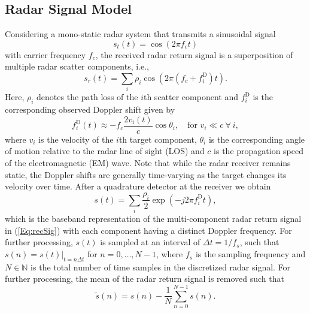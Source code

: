 \subsection{Radar Signal Model}
Considering a mono-static radar system that transmits a sinusoidal signal \cite{Che11}
\begin{equation} %
s_t(t) = \cos{\left(2 \pi f_c t\right)}
\end{equation}
with carrier frequency $f_c$, the received radar return signal is a superposition of multiple radar scatter components, i.e.,
\begin{equation}
s_r(t) = \sum_i \rho_i \cos{\left(2 \pi \left(f_c + f^\mathrm{D}_i \right) t\right)}.
\label{Eq:recSig}
\end{equation}
Here, $\rho_i$ denotes the path loss of the $i$th scatter component and $f^\mathrm{D}_i $ is the corresponding observed Doppler shift given by 
\begin{equation}
f^\mathrm{D}_i (t) \approx - f_c \frac{2 v_i(t)}{c} \cos{\theta_i}, \quad \text{for~} v_i \ll c~\forall~i,
\label{eq:Doppler}
\end{equation}
where $v_i$ is the velocity of the $i$th target component, $\theta_i$ is the corresponding angle of motion relative to the radar line of sight (LOS) and $c$ is the propagation speed of the electromagnetic (EM) wave. Note that while the radar receiver remains static, the Doppler shifts are generally time-varying as the target changes its velocity over time. After a quadrature detector at the receiver we obtain
\begin{equation}
s(t) = \sum_i \frac{\rho_i}{2} \exp{\left(-j 2 \pi f^\mathrm{D}_i  t\right)},
\end{equation}
which is the baseband representation of the multi-component radar return signal in (\ref{Eq:recSig}) with each component having a distinct Doppler frequency. For further processing, $s(t)$ is sampled at an interval of $\Delta t = 1/f_s$, such that $s(n) = s(t)|_{t=n\Delta t}$ for $n = 0, \dots ,N-1$, where $f_s$ is the sampling frequency and $N \in \mathbb{N}$ is the total number of time samples in the discretized radar signal. For further processing, the mean of the radar return signal is removed such that
\begin{equation}\label{eg:remmean}
\tilde{s}(n) = s(n) - \frac{1}{N} \sum_{n=0}^{N-1} s(n).
\end{equation}


